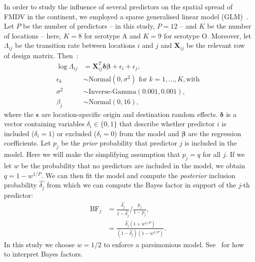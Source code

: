 \documentclass[a4paper,10pt]{article}
\begin{document}
In order to study the influence of several predictors on the spatial spread of FMDV in the continent, we employed a sparse generalised linear model (GLM)~\citep{M-Lemey2014,M-Dudas2017}.
Let $P$ be the number of predictors -- in this study, $P = 12$ -- and $K$ be the number of locations -- here, $K = 8$ for serotype A and $K = 9$ for serotype O.
Moreover, let $\Lambda_{ij}$ be the transition rate between locations $i$ and $j$ and $\boldsymbol X_{ij}$ be the relevant row of design matrix.
Then~\citep{M-Dudas2017}:
\begin{align*}
 \log \Lambda_{ij}  &= \boldsymbol X_{ij}^T \boldsymbol\delta \boldsymbol{\beta}
+ \epsilon_i + \epsilon_j, \\
\epsilon_k &\sim \text{Normal}(0, \sigma^2) \text{ for } k = 1, \ldots, K, \text{with} \\
\sigma^2 &\sim \text{Inverse-Gamma}(0.001, 0.001),\\
\beta_j &\sim \text{Normal}(0, 16),
\end{align*}
where the $\boldsymbol\epsilon$ are location-specific origin and destination random effects.
$\boldsymbol\delta$ is a vector containing variables $\delta_i \in \{0, 1\}$ that describe whether predictor $i$ is included ($\delta_i = 1$) or excluded ($\delta_i = 0$) from the model and $\boldsymbol\beta$ are the regression coefficients.
Let $p_j$ be the \textit{prior} probability that predictor $j$ is included in the model.
Here we will make the simplifying assumption that $p_j = q$ for all $j$.
If we let $w$ be the probability that no predictors are included in the model, we obtain  $q = 1 - w^{1/P}$.
We can then fit the model and compute the \textit{posterior} inclusion probability $\hat{\delta_j}$ from which we can compute the Bayes factor in support of the $j$-th predictor:
\begin{align*}
 \text{BF}_j &= \frac{\hat{\delta_j} }{1-\hat{\delta_j} }/\frac{p_j}{1-p_j}, \\
  &= \frac{\hat{\delta_j} (1 + w^{1/P})}{(1-\hat{\delta_j})(1 - w^{1/P}) }.
\end{align*}
In this study we choose $w = 1/2$ to enforce a parsimonious model.
See~\citet{M-KassRaftery1995} for how to interpret Bayes factors.



\end{document}
